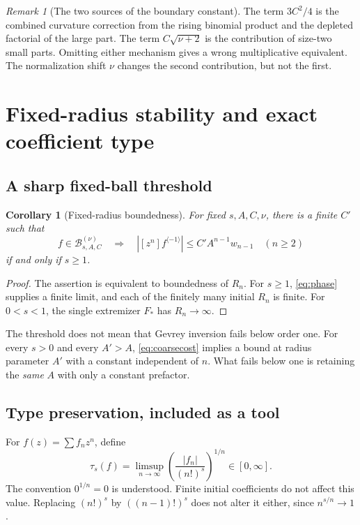 \documentclass[11pt,a4paper]{article}
\newtheorem{corollary}[theorem]{Corollary}
\theoremstyle{definition}
\theoremstyle{remark}
\newtheorem{remark}[theorem]{Remark}
\newcommand{\typ}{\tau_s}
\newcommand{\inv}{^{\langle-1\rangle}}
\numberwithin{equation}{section}
\begin{document}
\begin{remark}[The two sources of the boundary constant]
The term $3C^2/4$ is the combined curvature correction from the rising
binomial product and the depleted factorial of the large part. The term
$C\sqrt{\nu+2}$ is the contribution of size-two small parts. Omitting
either mechanism gives a wrong multiplicative equivalent. The
normalization shift $\nu$ changes the second contribution, but not the
first.
\end{remark}

\section{Fixed-radius stability and exact coefficient type}
\label{sec:type}

\subsection{A sharp fixed-ball threshold}
\begin{corollary}[Fixed-radius boundedness]\label{cor:fixedball}
For fixed $s,A,C,\nu$, there is a finite $C'$ such that
\[
 f\in\mathcal B_{s,A,C}^{(\nu)}
 \quad\Longrightarrow\quad
 |[z^n]f\inv|\le C' A^{n-1}w_{n-1}\quad(n\ge2)
\]
if and only if $s\ge1$.
\end{corollary}
\begin{proof}
The assertion is equivalent to boundedness of $R_n$. For $s\ge1$,
\eqref{eq:phase} supplies a finite limit, and each of the finitely many
initial $R_n$ is finite. For $0<s<1$, the single extremizer $F_*$ has
$R_n\to\infty$.
\end{proof}

The threshold does not mean that Gevrey inversion fails below order one.
For every $s>0$ and every $A'>A$, \eqref{eq:coarsecost} implies a bound
at radius parameter $A'$ with a constant independent of $n$. What fails
below one is retaining the \emph{same} $A$ with only a constant prefactor.

\subsection{Type preservation, included as a tool}
For $f(z)=\sum f_nz^n$, define
\begin{equation}
 \typ(f)=\limsup_{n\to\infty}
     \left(\frac{|f_n|}{(n!)^s}\right)^{1/n}\in[0,\infty].
 \label{eq:type}
\end{equation}
The convention $0^{1/n}=0$ is understood. Finite initial coefficients do
not affect this value. Replacing $(n!)^s$ by $((n-1)!)^s$ does not alter
it either, since $n^{s/n}\to1$.
\end{document}
